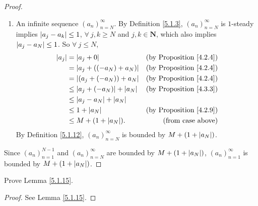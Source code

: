 \begin{proof}
\begin{enumerate}
    \item An infinite sequence \((a_n)_{n = N}^{\infty}\).
    By Definition \ref{5.1.3}, \((a_n)_{n = N}^{\infty}\) is \(1\)-steady implies \(\abs*{a_j - a_k} \leq 1\), \(\forall\ j, k \geq N\) and  \(j, k \in \mathbf{N}\), which also implies \(\abs*{a_j - a_N} \leq 1\).
    So \(\forall\ j \leq N\),
    \begin{align*}
    \abs*{a_j} &= \abs*{a_j + 0} & \text{(by Proposition \ref{4.2.4})} \\
    &= \abs*{a_j + ((-a_N) + a_N)} & \text{(by Proposition \ref{4.2.4})} \\
    &= \abs*{(a_j + (-a_N)) + a_N} & \text{(by Proposition \ref{4.2.4})} \\
    &\leq \abs*{a_j + (-a_N)} + \abs*{a_N} & \text{(by Proposition \ref{4.3.3})} \\
    &\leq \abs*{a_j - a_N} + \abs*{a_N} \\
    &\leq 1 + \abs*{a_N} & \text{(by Proposition \ref{4.2.9})} \\
    &\leq M + (1 + \abs*{a_N}). & \text{(from case above)}
    \end{align*}
    By Definition \ref{5.1.12}, \((a_n)_{n = N}^{\infty}\) is bounded by \(M + (1 + \abs*{a_N})\).
\end{enumerate}
Since \((a_n)_{n = 1}^{N - 1}\) and \((a_n)_{n = N}^{\infty}\) are bounded by \(M + (1 + \abs*{a_N})\), \((a_n)_{n = 1}^{\infty}\) is bounded by \(M + (1 + \abs*{a_N})\).
\end{proof}

\exercisesection

\begin{exercise}\label{ex 5.1.1}
Prove Lemma \ref{5.1.15}.
\end{exercise}

\begin{proof}
See Lemma \ref{5.1.15}.
\end{proof}